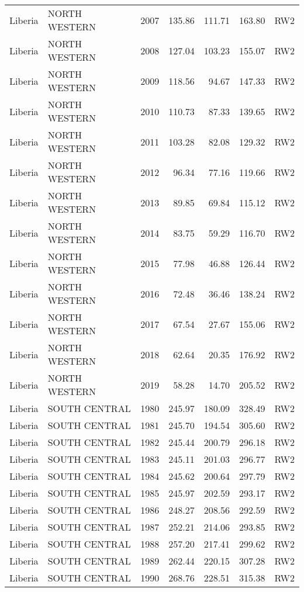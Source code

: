 \begin{longtable}{lllrrrl}
  Liberia & NORTH WESTERN & 2007 & 135.86 & 111.71 & 163.80 & RW2 \\ 
  Liberia & NORTH WESTERN & 2008 & 127.04 & 103.23 & 155.07 & RW2 \\ 
  Liberia & NORTH WESTERN & 2009 & 118.56 & 94.67 & 147.33 & RW2 \\ 
  Liberia & NORTH WESTERN & 2010 & 110.73 & 87.33 & 139.65 & RW2 \\ 
  Liberia & NORTH WESTERN & 2011 & 103.28 & 82.08 & 129.32 & RW2 \\ 
  Liberia & NORTH WESTERN & 2012 & 96.34 & 77.16 & 119.66 & RW2 \\ 
  Liberia & NORTH WESTERN & 2013 & 89.85 & 69.84 & 115.12 & RW2 \\ 
  Liberia & NORTH WESTERN & 2014 & 83.75 & 59.29 & 116.70 & RW2 \\ 
  Liberia & NORTH WESTERN & 2015 & 77.98 & 46.88 & 126.44 & RW2 \\ 
  Liberia & NORTH WESTERN & 2016 & 72.48 & 36.46 & 138.24 & RW2 \\ 
  Liberia & NORTH WESTERN & 2017 & 67.54 & 27.67 & 155.06 & RW2 \\ 
  Liberia & NORTH WESTERN & 2018 & 62.64 & 20.35 & 176.92 & RW2 \\ 
  Liberia & NORTH WESTERN & 2019 & 58.28 & 14.70 & 205.52 & RW2 \\ 
  Liberia & SOUTH CENTRAL & 1980 & 245.97 & 180.09 & 328.49 & RW2 \\ 
  Liberia & SOUTH CENTRAL & 1981 & 245.70 & 194.54 & 305.60 & RW2 \\ 
  Liberia & SOUTH CENTRAL & 1982 & 245.44 & 200.79 & 296.18 & RW2 \\ 
  Liberia & SOUTH CENTRAL & 1983 & 245.11 & 201.03 & 296.77 & RW2 \\ 
  Liberia & SOUTH CENTRAL & 1984 & 245.62 & 200.64 & 297.79 & RW2 \\ 
  Liberia & SOUTH CENTRAL & 1985 & 245.97 & 202.59 & 293.17 & RW2 \\ 
  Liberia & SOUTH CENTRAL & 1986 & 248.27 & 208.56 & 292.59 & RW2 \\ 
  Liberia & SOUTH CENTRAL & 1987 & 252.21 & 214.06 & 293.85 & RW2 \\ 
  Liberia & SOUTH CENTRAL & 1988 & 257.20 & 217.41 & 299.62 & RW2 \\ 
  Liberia & SOUTH CENTRAL & 1989 & 262.44 & 220.15 & 307.28 & RW2 \\ 
  Liberia & SOUTH CENTRAL & 1990 & 268.76 & 228.51 & 315.38 & RW2 \\ 

\end{longtable}
